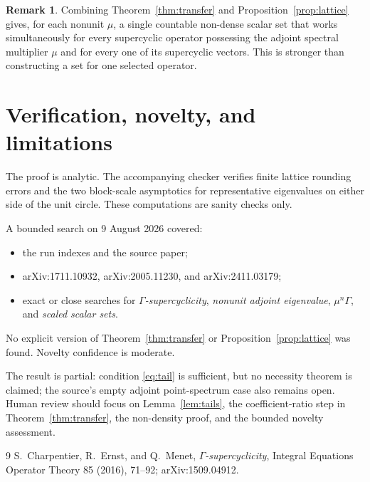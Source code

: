 \documentclass[11pt]{article}
\theoremstyle{definition}
\newtheorem{remark}[theorem]{Remark}
\begin{document}
\begin{remark}
Combining Theorem~\ref{thm:transfer} and Proposition~\ref{prop:lattice}
gives, for each nonunit $\mu$, a single countable non-dense scalar set
that works simultaneously for every supercyclic operator possessing the
adjoint spectral multiplier $\mu$ and for every one of its supercyclic vectors.
This is stronger than constructing a set for one selected operator.
\end{remark}

\section{Verification, novelty, and limitations}

The proof is analytic. The accompanying checker verifies finite lattice
rounding errors and the two block-scale asymptotics for representative
eigenvalues on either side of the unit circle. These computations are
sanity checks only.

A bounded search on 9 August 2026 covered:
\begin{itemize}[nosep,leftmargin=1.4em]
\item the run indexes and the source paper;
\item arXiv:1711.10932, arXiv:2005.11230, and arXiv:2411.03179;
\item exact or close searches for \emph{$\Gamma$-supercyclicity},
  \emph{nonunit adjoint eigenvalue}, \emph{$\mu^n\Gamma$}, and
  \emph{scaled scalar sets}.
\end{itemize}
No explicit version of Theorem~\ref{thm:transfer} or
Proposition~\ref{prop:lattice} was found. Novelty confidence is moderate.

The result is partial: condition \eqref{eq:tail} is sufficient, but no
necessity theorem is claimed; the source's empty adjoint point-spectrum case
also remains open. Human review should focus on Lemma~\ref{lem:tails}, the
coefficient-ratio step in Theorem~\ref{thm:transfer}, the non-density proof,
and the bounded novelty assessment.

\begin{thebibliography}{9}
S.~Charpentier, R.~Ernst, and Q.~Menet,
\emph{$\Gamma$-supercyclicity}, Integral Equations Operator Theory
85 (2016), 71--92; arXiv:1509.04912.
\end{thebibliography}
\end{document}
